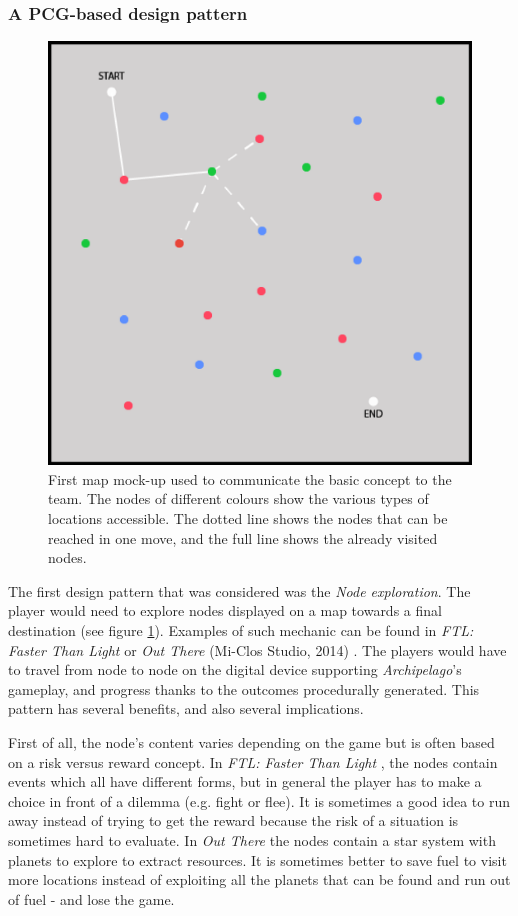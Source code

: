 \subsubsection{A PCG-based design pattern}
\begin{figure}[!ht]
    \centering
    \includegraphics[scale=0.4]{Images/protomap.png}
    \caption{First map mock-up used to communicate the basic concept to the team. The nodes of different colours show the various types of locations accessible. The dotted line shows the nodes that can be reached in one move, and the full line shows the already visited nodes.}
    \label{fig:map}
\end{figure}
The first design pattern that was considered  was the \textit{Node exploration}. The player would need to explore nodes displayed on a map towards a final destination (see figure \ref{fig:map}). Examples of such mechanic can be found in \textit{FTL: Faster Than Light} \cite{game:ftl} or \textit{Out There} (Mi-Clos Studio, 2014) \cite{game:outthere}. The players would have to travel from node to node on the digital device supporting  \textit{Archipelago}'s gameplay, and progress thanks to the outcomes procedurally generated. This pattern has several benefits, and also several implications. 

First of all, the node's content varies depending on the game but is often based on a risk versus reward concept. In \textit{FTL: Faster Than Light} \cite{game:ftl}, the nodes contain events which all have different forms, but in general the player has to make a choice in front of a dilemma (e.g. fight or flee). It is sometimes a good idea to run away instead of trying to get the reward because the risk of a situation is sometimes hard to evaluate. In \textit{Out There} \cite{game:outthere} the nodes contain a star system with planets to explore to extract resources. It is sometimes better to save fuel to visit more locations instead of exploiting all the planets that can be found and run out of fuel - and lose the game.  

